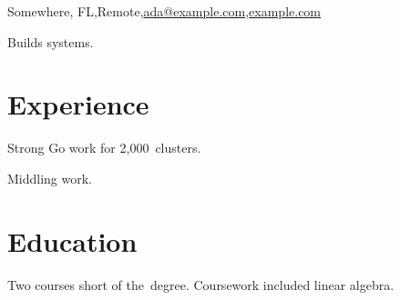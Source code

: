 \documentclass{jrresume}
\begin{document}
  {Somewhere, FL\sep{}Remote\sep{}\href{mailto:ada@example.com}{ada@example.com}\sep{}\href{https://example.com}{example.com}}

Builds systems.

\section{Experience}

\begin{highlights}
  \item {} Strong Go work for 2,000~clusters.
\end{highlights}

\begin{highlights}
  \item Middling work.
\end{highlights}

\section{Education}

Two courses short of the~degree. Coursework included linear algebra.
\end{document}
